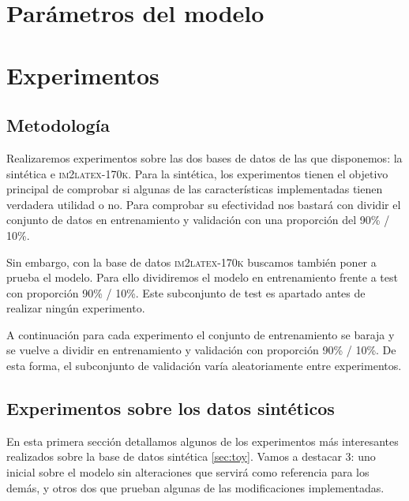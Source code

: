 \documentclass[a4paper, 20pt, dvipsnames]{article}
\begin{document}

\section{Parámetros del modelo}
\label{sec:params}


\section{Experimentos}

\subsection{Metodología}

Realizaremos experimentos sobre las dos bases de datos de las que disponemos: la
sintética e \textsc{im2latex-170k}. Para la sintética, los experimentos tienen
el objetivo principal de comprobar si algunas de las características
implementadas tienen verdadera utilidad o no. Para comprobar su efectividad nos
bastará con dividir el conjunto de datos en entrenamiento y validación con una
proporción del 90\% / 10\%.

Sin embargo, con la base de datos \textsc{im2latex-170k} buscamos también poner
a prueba el modelo. Para ello dividiremos el modelo en entrenamiento frente a
test con proporción 90\% / 10\%. Este subconjunto de test es apartado antes de
realizar ningún experimento.

A continuación para cada experimento el conjunto de entrenamiento se baraja y se
vuelve a dividir en entrenamiento y validación con proporción 90\% / 10\%. De
esta forma, el subconjunto de validación varía aleatoriamente entre
experimentos.

\subsection{Experimentos sobre los datos sintéticos}

En esta primera sección detallamos algunos de los experimentos más interesantes
realizados sobre la base de datos sintética \ref{sec:toy}. Vamos a destacar 3:
uno inicial sobre el modelo sin alteraciones que servirá como referencia para
los demás, y otros dos que prueban algunas de las modificaciones implementadas.
\end{document}
